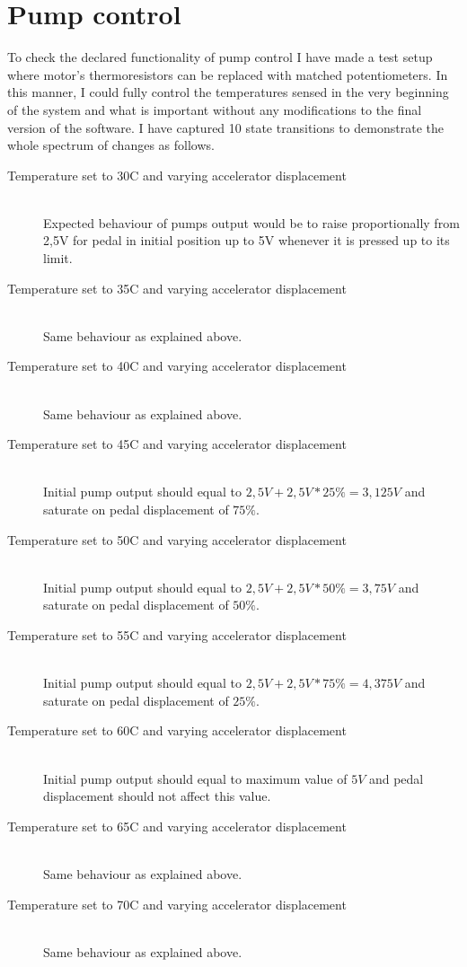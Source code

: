 \section{Pump control}
To check the declared functionality of pump control I have made a test setup where motor's thermoresistors can be replaced with matched potentiometers. In this manner, I could fully control the temperatures sensed in the very beginning of the system and what is important without any modifications to the final version of the software.
\newline
\newline
I have captured 10 state transitions to demonstrate the whole spectrum of changes as follows.
\begin{description}
    \item[Temperature set to 30\textdegree C and varying accelerator displacement] \hfill \\ Expected behaviour of pumps output would be to raise proportionally from 2,5V for pedal in initial position up to 5V whenever it is pressed up to its limit.
    \item[Temperature set to 35\textdegree C and varying accelerator displacement] \hfill \\ Same behaviour as explained above.
    \item[Temperature set to 40\textdegree C and varying accelerator displacement] \hfill \\ Same behaviour as explained above.
    \item[Temperature set to 45\textdegree C and varying accelerator displacement] \hfill \\ Initial pump output should equal to $2,5V + 2,5V*25\% = 3,125V$ and saturate on pedal displacement of $75\% $.
    \item[Temperature set to 50\textdegree C and varying accelerator displacement] \hfill \\ Initial pump output should equal to $2,5V + 2,5V*50\% = 3,75V$ and saturate on pedal displacement of $50\% $.
    \item[Temperature set to 55\textdegree C and varying accelerator displacement] \hfill \\ Initial pump output should equal to $2,5V + 2,5V*75\% = 4,375V$ and saturate on pedal displacement of $25\% $.
    \item[Temperature set to 60\textdegree C and varying accelerator displacement] \hfill \\ Initial pump output should equal to maximum value of $5V$ and pedal displacement should not affect this value.
    \item[Temperature set to 65\textdegree C and varying accelerator displacement] \hfill \\ Same behaviour as explained above.
    \item[Temperature set to 70\textdegree C and varying accelerator displacement] \hfill \\ Same behaviour as explained above.
\end{description}
